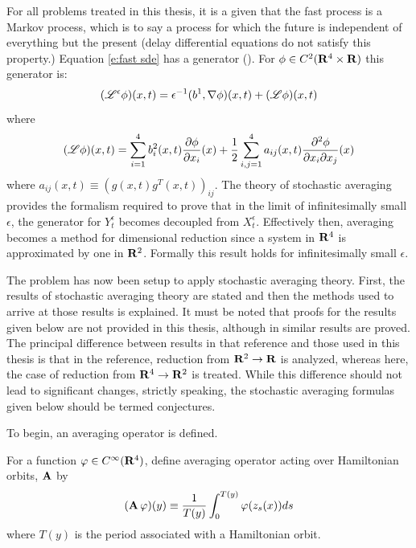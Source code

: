 For all problems treated in this thesis, it is a given that the fast process is a Markov process, which is to say a process for which the future is independent of everything but the present (delay differential equations do not satisfy this property.) Equation \eqref{e:fast sde} has a generator (\citep[\S 7.3]{øksendal03:_stoch_differ_equat}). For $\phi \in C^2(\mathbf R^4 \times \mathbf R)$ this generator is:
\[
(\mathscr L^\epsilon \phi)(x,t) = \epsilon^{-1} (b^1,\nabla \phi)(x,t) + (\mathscr L \phi)(x,t)
\]
where
\[
(\mathscr L \phi)(x,t) = \sum_{i = 1}^4 b_i^2(x,t) \frac{\partial \phi}{\partial x_i}(x) + \frac12 \sum_{i,j=1}^4 a_{ij}(x,t) \frac{\partial^2 \phi}{\partial x_i \partial x_j}(x)
\]
where $a_{ij}(x,t) \equiv (g(x,t) g^T(x,t))_{ij}$. The theory of stochastic averaging provides the formalism required to prove that in the limit of infinitesimally small $\epsilon$, the generator for
$Y_t^\epsilon$ becomes decoupled from $X_t^\epsilon$. Effectively then, averaging becomes a method for dimensional reduction since a system in $\mathbf R^4$ is approximated by one in $\mathbf R^2$. Formally this result holds for infinitesimally small $\epsilon$.

The problem has now been setup to apply stochastic averaging theory. First, the results of stochastic averaging theory are stated and then the methods used to arrive at those results is explained. It must be noted that proofs for the results given below are not provided in this thesis, although in \citet{namachchivaya01:_unified_approac_noisy_nonlin_mathieu_type_system} similar results are proved. The principal difference between results in that reference and those used in this thesis is that in the reference, reduction from $\mathbf R^2 \to \mathbf R$ is analyzed, whereas here, the case of reduction from $\mathbf R^4 \to \mathbf R^2$ is treated. While this difference should not lead to significant changes, strictly speaking, the stochastic averaging formulas given below should be termed conjectures.

To begin, an averaging operator is defined.
\begin{definition}
\label{d:Aave}
For a function $\varphi \in C^\infty(\mathbf R^4)$, define averaging operator acting over Hamiltonian orbits, $\operatorname{\mathbf A}$ by
\[
(\operatorname{\mathbf A} \varphi) (y) \equiv \frac{1}{T(y)} \int_0^{T(y)} \varphi(z_s(x)) ds
\]
where $T(y)$ is the period associated with a Hamiltonian orbit.
\end{definition}

